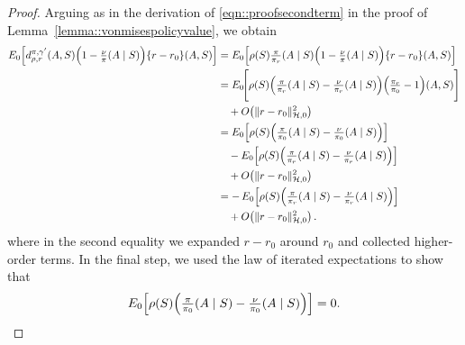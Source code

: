 \documentclass[11pt]{article}
\theoremstyle{plain}
\begin{document}
\begin{proof}
Arguing as in the derivation of \eqref{eqn::proofsecondterm} in the proof of Lemma~\ref{lemma::vonmisespolicyvalue}, we obtain
\begin{align}
E_0\!\left[d_{\rho,r}^{\pi,\gamma'}(A,S)\Bigl(1 - \tfrac{\nu}{\pi}(A \mid S)\Bigr)\{r - r_0\}(A,S)\right]
&= E_0\!\left[\rho(S)\tfrac{\pi}{\pi_r}(A\mid S)\Bigl(1 - \tfrac{\nu}{\pi}(A \mid S)\Bigr)\{r - r_0\}(A,S)\right] \notag \\
&= E_0\!\Bigg[\rho(S)\Bigl(\tfrac{\pi}{\pi_r}(A\mid S) - \tfrac{\nu}{\pi_r}(A\mid S)\Bigr)\Bigl(\tfrac{\pi_r}{\pi_0} - 1\Bigr)(A,S)\Bigg] \notag \\
&\quad + O\!\left(\|r - r_0\|_{\mathcal{H}, 0}^2\right) \notag \\
&= E_0\!\left[\rho(S)\Bigl(\tfrac{\pi}{\pi_0}(A\mid S) - \tfrac{\nu}{\pi_0}(A\mid S)\Bigr)\right] \notag \\
&\quad - E_0\!\left[\rho(S)\Bigl(\tfrac{\pi}{\pi_r}(A\mid S) - \tfrac{\nu}{\pi_r}(A\mid S)\Bigr)\right] \notag \\
&\quad + O\!\left(\|r - r_0\|_{\mathcal{H}, 0}^2\right) \notag \\
&= -\,E_0\!\left[\rho(S)\Bigl(\tfrac{\pi}{\pi_r}(A\mid S) - \tfrac{\nu}{\pi_r}(A\mid S)\Bigr)\right] \notag \\
&\quad + O\!\left(\|r - r_0\|_{\mathcal{H}, 0}^2\right).
\label{eq:reward_diff_expansion}
\end{align}
where in the second equality we expanded $r - r_0$ around $r_0$ and collected higher-order terms. In the final step, we used the law of iterated expectations to show that 
\[
E_0\!\left[\rho(S)\Bigl(\tfrac{\pi}{\pi_0}(A\mid S) - \tfrac{\nu}{\pi_0}(A\mid S)\Bigr)\right] = 0.
\]



\end{proof}
\end{document}
